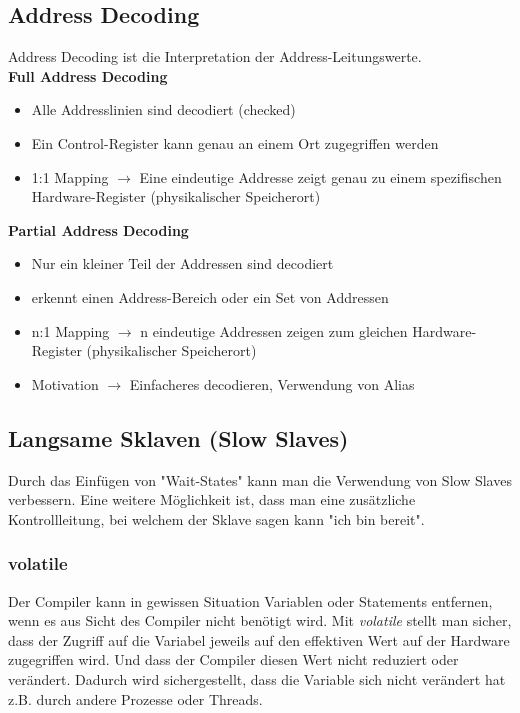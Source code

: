 \documentclass{article}
\begin{document}
\subsection{Address Decoding}
Address Decoding ist die Interpretation der Address-Leitungswerte.\\
\textbf{Full Address Decoding}
\begin{itemize}
	\item Alle Addresslinien sind decodiert (checked)
	\item Ein Control-Register kann genau an einem Ort zugegriffen werden
	\item 1:1 Mapping  $\rightarrow$ Eine eindeutige Addresse zeigt genau zu einem spezifischen Hardware-Register (physikalischer Speicherort)
\end{itemize}

\textbf{Partial Address Decoding}
\begin{itemize}
	\item Nur ein kleiner Teil der Addressen sind decodiert
	\item erkennt einen Address-Bereich oder ein Set von Addressen
	\item n:1 Mapping $\rightarrow$ n eindeutige Addressen zeigen zum gleichen Hardware-Register (physikalischer Speicherort)
	\item Motivation $\rightarrow$ Einfacheres decodieren, Verwendung von Alias
\end{itemize}

\subsection{Langsame Sklaven (Slow Slaves)}
Durch das Einfügen von "Wait-States" kann man die Verwendung von Slow Slaves verbessern. Eine weitere Möglichkeit ist,  dass man eine zusätzliche Kontrollleitung, bei welchem der Sklave sagen kann "ich bin bereit".

\subsubsection{volatile}
Der Compiler kann in gewissen Situation Variablen oder Statements entfernen, wenn es aus Sicht des Compiler nicht benötigt wird. Mit \textit{volatile} stellt man sicher, dass der Zugriff auf die Variabel jeweils auf den effektiven Wert auf der Hardware zugegriffen wird. Und dass der Compiler diesen Wert nicht reduziert oder verändert. Dadurch wird sichergestellt, dass die Variable sich nicht verändert hat z.B. durch andere Prozesse oder Threads. 
\end{document}
